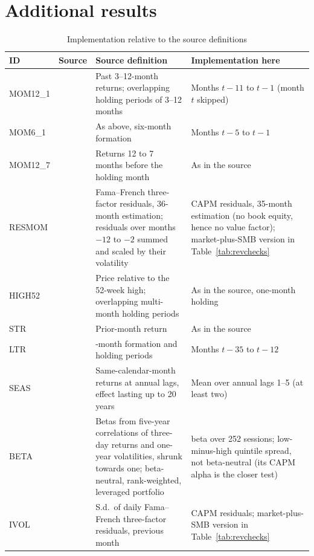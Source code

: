 \documentclass[11pt]{article}
\begin{document}
\section{Additional results}\label{app:additional}

\begin{table}[H]
\centering\footnotesize
{}
\caption{Implementation relative to the source definitions}\label{tab:adapt}
\begin{tabularx}{\linewidth}{@{}l>{\raggedright\arraybackslash}p{2.7cm}>{\raggedright\arraybackslash}X>{\raggedright\arraybackslash}X@{}}
\toprule
ID & Source & Source definition & Implementation here \\
\midrule
MOM12\_1 & \citet{jegadeesh1993returns} & Past 3--12-month returns; overlapping holding periods of 3--12 months & Months $t-11$ to $t-1$ (month $t$ skipped) \\
MOM6\_1 & \citet{jegadeesh1993returns} & As above, six-month formation & Months $t-5$ to $t-1$ \\
MOM12\_7 & \citet{novymarx2012momentum} & Returns 12 to 7 months before the holding month & As in the source \\
RESMOM & \citet{blitz2011residual} & Fama--French three-factor residuals, 36-month estimation; residuals over months $-12$ to $-2$ summed and scaled by their volatility & CAPM residuals, 35-month estimation (no book equity, hence no value factor); market-plus-SMB version in Table~\ref{tab:revchecks} \\
HIGH52 & \citet{george2004week} & Price relative to the 52-week high; overlapping multi-month holding periods & As in the source, one-month holding \\
STR & \citet{jegadeesh1990evidence} & Prior-month return & As in the source \\
LTR & \citet{debondt1985overreact} & 36-month formation and holding periods & Months $t-35$ to $t-12$ \\
SEAS & \citet{heston2008seasonality} & Same-calendar-month returns at annual lags, effect lasting up to 20 years & Mean over annual lags 1--5 (at least two) \\
BETA & \citet{frazzini2014betting} & Betas from five-year correlations of three-day returns and one-year volatilities, shrunk towards one; beta-neutral, rank-weighted, leveraged portfolio & \citet{dimson1979risk} beta over 252 sessions; low-minus-high quintile spread, not beta-neutral (its CAPM alpha is the closer test) \\
IVOL & \citet{ang2006cross} & S.d.\ of daily Fama--French three-factor residuals, previous month & CAPM residuals; market-plus-SMB version in Table~\ref{tab:revchecks} \\

\end{tabularx}
\end{table}
\end{document}
